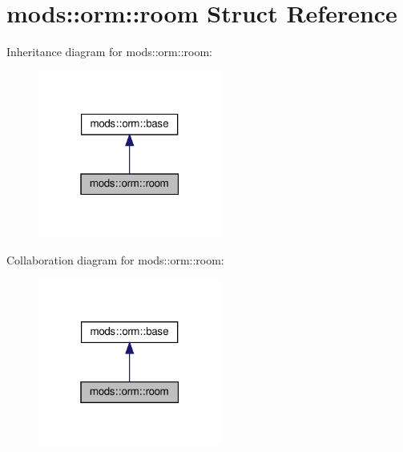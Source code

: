 \hypertarget{structmods_1_1orm_1_1room}{}\section{mods\+:\+:orm\+:\+:room Struct Reference}
\label{structmods_1_1orm_1_1room}


Inheritance diagram for mods\+:\+:orm\+:\+:room\+:
\nopagebreak
\begin{figure}[H]
\begin{center}
\leavevmode
\includegraphics[width=171pt]{structmods_1_1orm_1_1room__inherit__graph}
\end{center}
\end{figure}


Collaboration diagram for mods\+:\+:orm\+:\+:room\+:
\nopagebreak
\begin{figure}[H]
\begin{center}
\leavevmode
\includegraphics[width=171pt]{structmods_1_1orm_1_1room__coll__graph}
\end{center}
\end{figure}
